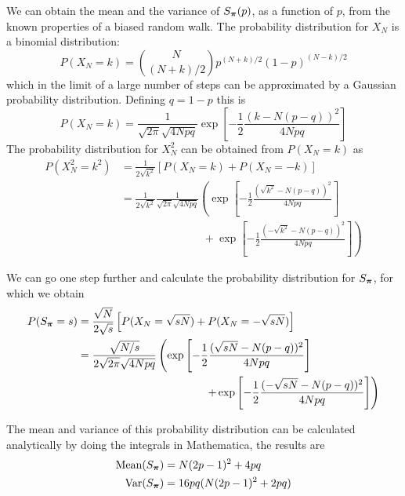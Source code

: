 We can obtain the mean and the variance of $S_{\bm{\pi}}(p)$, as a function
of $p$, from the known properties of a biased random walk.  The probability
distribution for $X_{N}$ is a binomial distribution: 
\begin{equation}
  P(X_{N}=k) = \binom{N}{ (N+k)/2 } p^{(N+k)/2} (1-p)^{(N-k)/2} 
\end{equation}
which in the limit of a large number of steps can be approximated by a
Gaussian probability distribution.  Defining $q=1-p$ this is
\begin{equation}
  P(X_{N}=k) =  \frac{1}{\sqrt{2\pi}\sqrt{4 N pq}} 
\exp\left[ -\frac{1}{2}\frac{(k-N(p-q))^{2}}{4 N pq }  \right]
\end{equation}
The probability distribution for $X_{N}^{2}$ can be obtained from $P(X_{N}=k)$ as 
\begin{equation}
\begin{split}
  P( X_{N}^{2} = k^{2} ) & = \frac{1}{2\sqrt{k^{2}}} [P( X_{N}=k)+P(X_{N}=-k)] \\
   & =
 \frac{1}{2\sqrt{k^{2}}} 
   \frac{1}{\sqrt{2\pi}\sqrt{4 N pq}} 
  \left(
\exp\left[ -\frac{1}{2}\frac{(\sqrt{k^{2}}-N(p-q))^{2}}{4 N pq }  \right]\right. \\
 & ~~~~~~~~~~~~~~~~~~~~~~~~~~~~~~~~~~ + \left.
\exp\left[ -\frac{1}{2}\frac{(-\sqrt{k^{2}}-N(p-q))^{2}}{4 N pq }  \right]  \right)
\end{split}
\end{equation}

We can go one step further and calculate the probability distribution for
$S_{\bm{\pi}}$, for which we obtain
\begin{equation}
\begin{split}
  P( S_{\bm{\pi}} = s ) & = \frac{\sqrt{N}}{2\sqrt{s}} 
     \left[ P( X_{N}=\sqrt{sN}) + P( X_{N}=-\sqrt{sN}) \right] \\
   & =
   \frac{\sqrt{N/s}}{2\sqrt{2\pi}\sqrt{4 N pq}}
   \left( 
    \exp\left[ -\frac{1}{2}\frac{(\sqrt{sN}-N(p-q))^{2}}{4 N pq }  \right] \right. \\ 
& ~~~~~~~~~~~~~~~~~~~~~~~~~~~~~~~~~~~ \left.
 +   \exp\left[ -\frac{1}{2}\frac{(-\sqrt{sN}-N(p-q))^{2}}{4 N pq }  \right]
   \right)
\end{split}
\label{eq:probSpi}
\end{equation}

The mean and variance of this probability distribution can be calculated
analytically by doing the integrals in Mathematica,  the results are
\begin{equation}
\begin{split} 
  \text{Mean}( S_{\bm{\pi}} ) & = N(2p-1)^{2} + 4pq \\ 
  \text{Var}( S_{\bm{\pi}} ) &  = 16pq( N(2p-1)^{2} + 2pq ) 
\end{split}
\end{equation}

